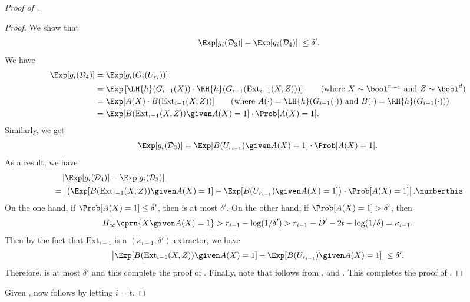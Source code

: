 \begin{proof}[Proof of ]
\begin{proof}
	    	We show that
            \begin{equation}\label{eq:prg-lc-triangle-3}
				\left|\Exp[g_i(\mathcal{D}_3)]-\Exp[g_i(\mathcal{D}_4)]\right| \leq \delta'.
			\end{equation}
	    	We have
	    	\begin{align*}
	    		\Exp[g_i(\mathcal{D}_4)]&=\Exp[g_i(G_i(U_{r_i}))]\\
	    		&=\Exp\left[\LH{h}(G_{i-1}(X))\cdot \RH{h}(G_{i-1}(\mathrm{Ext}_{i-1}(X,Z)))\right]
	    		\tag{where $X\sim\bool^{r_{i-1}}$ and $Z\sim\bool^{d}$}\\
	    		&=\Exp[A(X)\cdot B(\mathrm{Ext}_{i-1}(X,Z))]
	    		\tag{where $A(\cdot)= \LH{h}(G_{i-1}(\cdot))$  and $B(\cdot)= \RH{h}(G_{i-1}(\cdot))$}\\
	    		&=\Exp[B(\mathrm{Ext}_{i-1}(X,Z))\given A(X)=1]\cdot\Prob[A(X)=1].
	    	\end{align*}
	    	Similarly, we get
	    	\[
	    		\Exp[g_i(\mathcal{D}_3)]=\Exp[B(U_{r_{i-1}})\given A(X)=1]\cdot\Prob[A(X)=1].
	    	\]
	    	As a result, we have
	    	\begin{align*}\label{eq:prg-lc-triangle-3.1}
	    		&\quad\left|\Exp[g_i(\mathcal{D}_4)]-\Exp[g_i(\mathcal{D}_3)]\right|\\
	    		&=\left|\left(\Exp[B(\mathrm{Ext}_{i-1}(X,Z))\given A(X)=1]-\Exp[B(U_{r_{i-1}})\given A(X)=1]\right)\cdot\Prob[A(X)=1]\right|.
	    		\numberthis
	    	\end{align*}
		    On the one hand, if $\Prob[A(X)=1]\leq \delta'$, then  is at most $\delta'$. On the other hand, if $\Prob[A(X)=1]> \delta'$, then
	        \[
	        	H_{\infty}\cprn{X\given A(X)=1} > r_{i-1}-\log(1/\delta')> r_{i-1}-D'-2t -\log(1/\delta)=\kappa_{i-1}.
	        \]
	        Then by the fact that $\mathrm{Ext}_{i-1}$ is a $(\kappa_{i-1},\delta')$-extractor, we have
	        \[
	            \left|\Exp[B(\mathrm{Ext}_{i-1}(X,Z))\given A(X)=1] - \Exp[B(U_{r_{i-1}})\given A(X)=1]\right| \leq \delta'.
	        \]
	        Therefore,  is at most $\delta'$ and this complete the proof of . Finally, note that  follows from ,  and . This completes the proof of .
	    \end{proof}
	    
	    Given ,  now follows by letting $i=t$.
	\end{proof}
